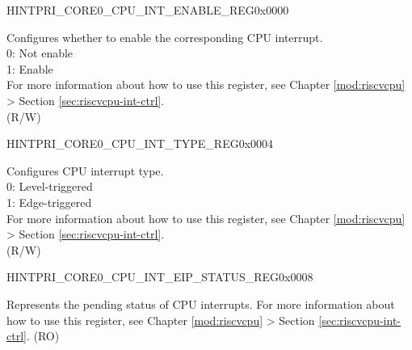 \begin{register}{H}{INTPRI\_CORE0\_CPU\_INT\_ENABLE\_REG}{0x0000}\label{regdesc:INTPRICORE0CPUINTENABLEREG}
%
\regnewline%
\begin{regdesc}\begin{reglist}
\label{fielddesc:INTPRICORE0CPUINTENABLE}\item [INTPRI\_CORE0\_CPU\_INT\_ENABLE] Configures whether to enable the corresponding CPU interrupt. \\
0: Not enable\\
1: Enable\\
For more information about how to use this register, see Chapter \ref{mod:riscvcpu} \textit{} > Section  \ref{sec:riscvcpu-int-ctrl}\textit{}.\\
(R/W)
\end{reglist}\end{regdesc}
\end{register}


\begin{register}{H}{INTPRI\_CORE0\_CPU\_INT\_TYPE\_REG}{0x0004}\label{regdesc:INTPRICORE0CPUINTTYPEREG}
%
\regnewline%
\begin{regdesc}\begin{reglist}
\label{fielddesc:INTPRICORE0CPUINTTYPE}\item [INTPRI\_CORE0\_CPU\_INT\_TYPE] Configures CPU interrupt type. \\
0: Level-triggered\\
1: Edge-triggered\\
For more information about how to use this register, see Chapter \ref{mod:riscvcpu} \textit{} > Section  \ref{sec:riscvcpu-int-ctrl}\textit{}.\\
(R/W)
\end{reglist}\end{regdesc}
\end{register}


\begin{register}{H}{INTPRI\_CORE0\_CPU\_INT\_EIP\_STATUS\_REG}{0x0008}\label{regdesc:INTPRICORE0CPUINTEIPSTATUSREG}
%
\regnewline%
\begin{regdesc}\begin{reglist}
\label{fielddesc:INTPRICORE0CPUINTEIPSTATUS}\item [INTPRI\_CORE0\_CPU\_INT\_EIP\_STATUS] Represents the pending status of CPU interrupts. For more information about how to use this register, see Chapter \ref{mod:riscvcpu} \textit{} > Section  \ref{sec:riscvcpu-int-ctrl}\textit{}. (RO)
\end{reglist}\end{regdesc}
\end{register}


